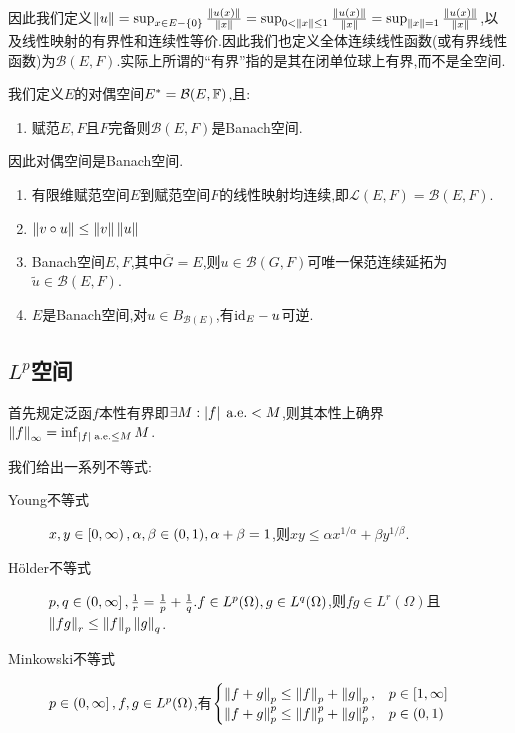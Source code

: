 \documentclass{article}
\newcommand{\mcLfunc}[1]{\mathcal{L}(#1)}
\newcommand{\mcBfunc}[1]{\mathcal{B}(#1)}
\begin{document}
因此我们定义$\left\|u\right\|=\sup_{x\in E-\left\{0\right\}}\frac{\left\|u(x)\right\|}{\left\|x\right\|}=\sup_{0<\left\|x\right\|\leq 1}\frac{\left\|u(x)\right\|}{\left\|x\right\|}=\sup_{\left\|x\right\|=1}\frac{\left\|u(x)\right\|}{\left\|x\right\|}$,以及线性映射的有界性和连续性等价.因此我们也定义全体连续线性函数(或有界线性函数)为$\mcBfunc{E,F}$.实际上所谓的``有界''指的是其在闭单位球上有界,而不是全空间.

我们定义$E$的对偶空间$E^*=\mcBfunc{E,\F}$,且:
\begin{enumerate}[resume]
    \item 赋范$E,F$且$F$完备则$\mcBfunc{E,F}$是Banach空间.
\end{enumerate}
因此对偶空间是Banach空间.

\begin{enumerate}[resume]
    \item 有限维赋范空间$E$到赋范空间$F$的线性映射均连续,即$\mcLfunc{E,F}=\mcBfunc{E,F}$.
    \item $\left\|v\circ u\right\|\leq \left\|v\right\|\left\|u\right\|$
    \item Banach空间$E,F$,其中$\overline{G}=E$,则$u\in\mcBfunc{G,F}$可唯一保范连续延拓为$\widetilde{u}\in\mcBfunc{E,F}$.
    \item $E$是Banach空间,对$u\in B_{\mcBfunc{E}}$,有$\mathrm{id}_E-u$可逆.
\end{enumerate}

\subsection{$L^p$空间}
首先规定泛函$f$本性有界即$\exists M:\left|f\right|\;\text{a.e.}<M$,则其本性上确界$\left\|f\right\|_\infty=\inf_{\left|f\right|\; \text{a.e.}\leq M}M$.

我们给出一系列不等式:\begin{description}
    \item[Young不等式] $x,y\in \left[0,\infty\right),\alpha,\beta\in (0,1), \alpha+\beta=1$,则$xy\leq \alpha x^{1/\alpha}+\beta y^{1/\beta}$.
    \item[H\"older不等式] $p,q\in \left(0,\infty\right], \frac{1}{r}=\frac{1}{p}+\frac{1}{q}. f\in L^p(\Omega), g\in L^q(\Omega)$,则$fg\in L^r(\Omega)$且$\left\|fg\right\|_r\leq \left\|f\right\|_p\left\|g\right\|_q$.\\
    \item[Minkowski不等式] $p\in\left(0,\infty\right], f,g\in L^p(\Omega)$,有$\begin{cases}
        \left\|f+g\right\|_p\leq \left\|f\right\|_p+\left\|g\right\|_p,&p\in \left[1,\infty\right]\\
        \left\|f+g\right\|_p^p\leq \left\|f\right\|_p^p+\left\|g\right\|_p^p,&p\in (0,1)
    \end{cases}$\\
\end{description}
\end{document}
